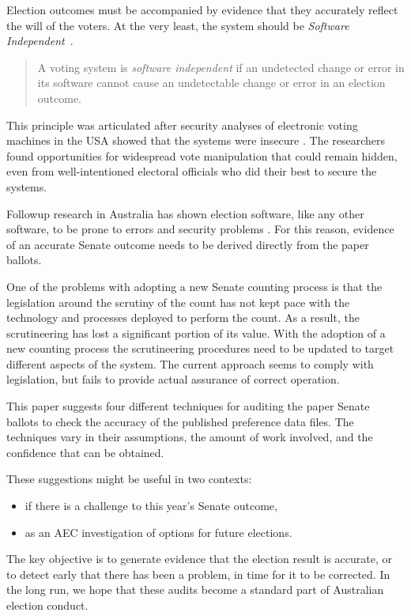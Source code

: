 \documentclass[10pt,a4paper]{article}
\begin{document}
Election outcomes must be accompanied by evidence that they accurately reflect the will of the voters. 
At the very least, the system should be \emph{Software Independent}~\cite{rivest2008notion}.
\begin{quote}
A voting system is \emph{software independent} if an undetected change or error in its software cannot cause an undetectable change or error in an election outcome.
\end{quote}

This principle was articulated after security analyses of electronic voting machines in the USA showed that the systems were insecure \cite{feldman2006security, kohno2004analysis, butler2008systemic, CAttbr}. The researchers found opportunities for widespread vote manipulation that could remain hidden, even from well-intentioned electoral officials who did their best to secure the systems.

Followup research in Australia  has shown election software, like any other software, to be prone to errors and security problems \cite{halderman2015new, CountingBug}.  For this reason, evidence of an accurate Senate outcome needs to be derived directly from the paper ballots.  

One of the problems with adopting a new Senate counting process is that the legislation around the scrutiny of the count has not kept pace with the technology and processes deployed to perform the count. As a result, the scrutineering has lost a significant portion of its value. With the adoption of a new counting process the scrutineering procedures need to be updated to target different aspects of the system. The current approach seems to  comply with legislation, but fails to provide actual assurance of correct operation. 

This paper suggests four different techniques for auditing the paper Senate ballots to check the accuracy of the published preference data files.  The techniques vary in their assumptions, the amount of work involved, and the confidence that can be obtained.

These suggestions might be useful in two contexts:
\begin{itemize}
\item if there is a challenge to this year's Senate outcome, 
\item as an AEC investigation of options for future elections.
\end{itemize}

The key objective is to generate evidence that the election result is accurate, or to detect early that there has been a problem, in time for it to be corrected.  In the long run, we hope that these audits become a standard part of Australian election conduct.
\end{document}
